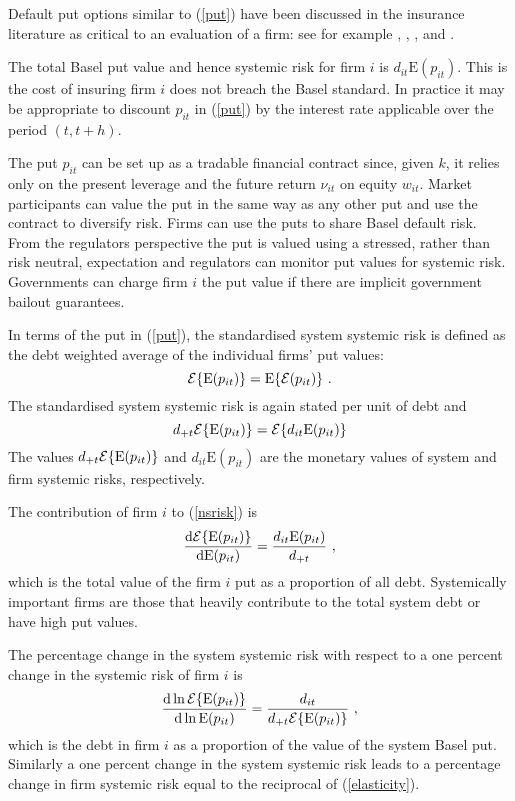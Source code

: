 \documentclass[authoryear]{elsarticle}
\newcommand{\E}{\mathrm{E}}
\newcommand{\Ex}{{\cal E}}
\newcommand{\de}{\mathrm{d}}
\newcommand{\eref}[1]{(\ref{#1})}
\newcommand{\be}[1]{\begin{equation}\label{#1}}
\newcommand{\ee}{\end{equation}}
\begin{document}
Default put options similar to \eref{put} have been discussed in the insurance literature as critical to an evaluation of a firm:  see for
example \citet{merton1977analytic}, \citet{doherty1986price}, \citet{cummins1988risk}, \citet{myers2001capital} and \citet{sherris2006solvency}.

The total Basel put value and hence systemic risk for firm  $i$ is   $d_{it}\E(p_{it})$.   This is the cost of insuring firm $i$ does not breach the Basel standard.  In practice it may be appropriate to discount $p_{it}$ in \eref{put} by the interest rate applicable over the period $(t,t+h)$.        

The put $p_{it}$ can be set up as a tradable financial contract since, given $k$, it relies only on the present leverage and the future return $\nu_{it}$ on equity $w_{it}$.  Market participants can value the put in  the same way as any other put and use the contract to diversify risk.  Firms can use the puts to share Basel default risk.    From the regulators perspective  the put is valued using a stressed, rather than risk neutral, expectation and regulators can monitor put values for systemic risk. Governments can charge firm $i$ the put value if there are  implicit government bailout guarantees.

In terms of the put in \eref{put}, the standardised system systemic risk is defined as the debt weighted average of the individual firms' put values:
\be{nsrisk}
\Ex\{\E(p_{it})\} = \E\{\Ex(p_{it})\}\ . 
\ee
The standardised system systemic risk is again stated per unit of debt and
$$
d_{+t}\Ex\{\E(p_{it})\} = \Ex\{d_{it}\E(p_{it})\} 
$$  
The values $d_{+t}\Ex\{\E(p_{it})\}$ and $d_{it}\E(p_{it})$ are the  monetary values of system and firm systemic risks, respectively. 



  The contribution of firm $i$ to \eref{nsrisk} is  
$$
\frac{\de \Ex\{\E(p_{it})\} }{\de \E(p_{it}) } = \frac{d_{it}\E(p_{it})}{d_{+t}}\ ,
$$
which is the total value of the firm $i$ put  as a proportion of all debt.  Systemically important firms are those that heavily contribute  to the total system debt or have high put values.  

The percentage change in the system systemic risk with respect to a one percent change in the systemic risk of firm $i$ is
\be{elasticity}
\frac{\de \ln \Ex\{\E(p_{it})\} }{\de \ln \E(p_{it}) } = \frac{d_{it}}{d_{+t}\Ex\{\E(p_{it})\}}\ ,
\ee
which is  the  debt in firm $i$ as a proportion of the value of the system Basel put.  Similarly a one percent change in the system systemic risk leads to a percentage change in firm systemic risk equal to the reciprocal of \eref{elasticity}.
\end{document}
